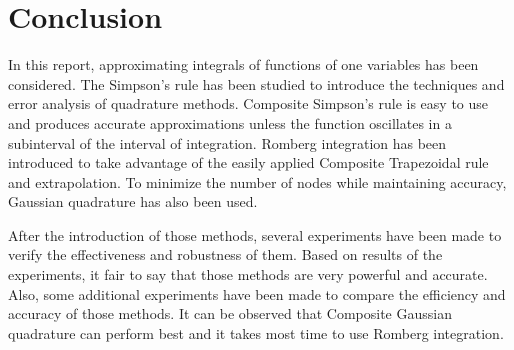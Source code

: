 \documentclass[preprint,12pt]{elsarticle}
\begin{document}
\section{Conclusion}
\label{S:5}

In this report, approximating integrals of functions of one variables has been considered. The Simpson’s rule has been studied to introduce the techniques and error analysis of quadrature methods. Composite Simpson’s rule is easy to use and produces accurate approximations unless the function oscillates in a subinterval of the interval of integration. Romberg integration has been introduced to take advantage of the easily applied Composite Trapezoidal rule and extrapolation. To minimize the number of nodes while maintaining accuracy, Gaussian quadrature has also been used.

After the introduction of those methods, several experiments have been made to verify the effectiveness and robustness of them. Based on results of the experiments, it fair to say that those methods are very powerful and accurate. Also, some additional experiments have been made to compare the efficiency and accuracy of those methods. It can be observed that Composite Gaussian quadrature can perform best and it takes most time to use Romberg integration.













\end{document}
